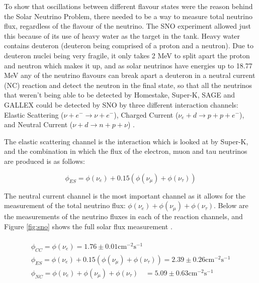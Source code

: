 \documentclass[11pt,oneside,a4paper]{article}
\begin{document}
To show that oscillations between different flavour states were the reason behind the Solar Neutrino Problem, there needed to be a way to measure total neutrino flux, regardless of the flavour of the neutrino. The SNO experiment allowed just this because of its use of heavy water as the target in the tank. Heavy water contains deuteron (deuteron being comprised of a proton and a neutron). Due to deuteron nuclei being very fragile, it only takes 2 MeV to split apart the proton and neutron which makes it up, and as solar neutrinos have energies up to 18.77 MeV any of the neutrino flavours can break apart a deuteron in a neutral current (NC) reaction and detect the neutron in the final state, so that all the neutrinos that weren't being able to be detected by Homestake, Super-K, SAGE and GALLEX \cite{gallex} could be detected by SNO by three different interaction channels: Elastic Scattering ($\nu + e^{-} \rightarrow \nu + e^{-}$), Charged Current ($\nu_{e} + d \rightarrow p + p + e^{-}$), and Neutral Current ($\nu + d \rightarrow n + p +\nu$) \cite{sno}.

The elastic scattering channel is the interaction which is looked at by Super-K, and the combination in which the flux of the electron, muon and tau neutrinos are produced is as follows:

\begin{equation}
\label{eq:superksolarnu}
\phi_{ES} = \phi(\nu_{e})+0.15(\phi(\nu_{\mu})+\phi(\nu_{\tau}))
\end{equation}	

The neutral current channel is the most important channel as it allows for the measurement of the total neutrino flux: $\phi(\nu_{e})+\phi(\nu_{\mu})+\phi(\nu_{\tau})$. Below are the measurements of the neutrino fluxes in each of the reaction channels, and Figure \ref{fig:sno} shows the full solar flux measurement \cite{sno1}.



\paragraph{}


\begin{gather*}
\label{eq:flux}
\phi_{C C}=\phi\left(\nu_{e}\right) =1.76 \pm 0.01 \mathrm{cm}^{-2} \mathrm{s}^{-1}\\ \phi_{E S} =\phi\left(\nu_{e}\right)+0.15\left(\phi\left(\nu_{\mu}\right)+\phi\left(\nu_{\tau}\right)\right)=2.39 \pm 0.26 \mathrm{cm}^{-2} \mathrm{s}^{-1} \\ \phi_{N C} =\phi\left(\nu_{e}\right)+\phi\left(\nu_{\mu}\right)+\phi\left(\nu_{\tau}\right) \quad=5.09 \pm 0.63 \mathrm{cm}^{-2} \mathrm{s}^{-1}
\end{gather*}
\end{document}
